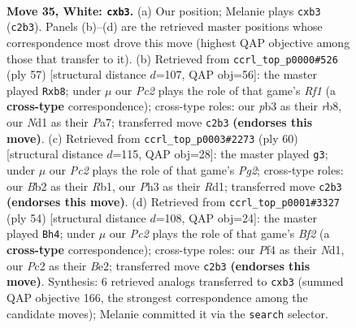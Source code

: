 \documentclass[11pt]{article}
\begin{document}
\clearpage

\begin{figure}[p]\centering
\begin{subfigure}{0.46\textwidth}\centering
\resizebox{\linewidth}{!}{%
\newchessgame
\chessboard[
  setfen={1n1qkb1r/4n3/r1p3p1/3p2P1/1Q1P1PBp/1p5P/1BP4R/2RN1K2 w - - 0 35},
  showmover=false,
  pgfstyle=straightmove, color=movearrow, markmove={c2-b3}
]}
\caption{}
\end{subfigure}\hfill
\begin{subfigure}{0.46\textwidth}\centering
\resizebox{\linewidth}{!}{%
\newchessgame
\chessboard[
  setfen={1R3rk1/p4pp1/7p/3pPq1P/2b5/b3PN2/P2Q1PP1/R2N2K1 b - - 0 29},
  showmover=false,
  pgfstyle=straightmove, color=movearrow, markmove={f8-b8}
]}
\caption{}
\end{subfigure}
\\[4pt]
\begin{subfigure}{0.46\textwidth}\centering
\resizebox{\linewidth}{!}{%
\newchessgame
\chessboard[
  setfen={2r1n1k1/1q2bpp1/1p1pp3/1Pn5/rN1BP3/5P1p/6PP/1R1RQB1K w - - 0 31},
  showmover=false,
  pgfstyle=straightmove, color=movearrow, markmove={g2-g3}
]}
\caption{}
\end{subfigure}\hfill
\begin{subfigure}{0.46\textwidth}\centering
\resizebox{\linewidth}{!}{%
\newchessgame
\chessboard[
  setfen={1r2r1k1/5q1p/3R4/3P1b1n/1pp2p2/3n1P2/1P1QBBPP/3N1R1K w - - 1 28},
  showmover=false,
  pgfstyle=straightmove, color=movearrow, markmove={f2-h4}
]}
\caption{}
\end{subfigure}
\caption{\textbf{Move 35, White: \texttt{cxb3}.} (a) Our position; Melanie plays \texttt{cxb3} (\texttt{c2b3}). Panels (b)--(d) are the retrieved master positions whose correspondence most drove this move (highest QAP objective among those that transfer to it). (b) Retrieved from \texttt{ccrl\_top\_p0000\#526} (ply 57) [structural distance $d$=107, QAP obj=56]: the master played \texttt{Rxb8}; under $\mu$ our \emph{Pc2} plays the role of that game's \emph{Rf1} (a \textbf{cross-type} correspondence); cross-type roles: our \emph{p}b3 as their \emph{r}b8, our \emph{N}d1 as their \emph{P}a7; transferred move \texttt{c2b3} \textbf{(endorses this move)}. (c) Retrieved from \texttt{ccrl\_top\_p0003\#2273} (ply 60) [structural distance $d$=115, QAP obj=28]: the master played \texttt{g3}; under $\mu$ our \emph{Pc2} plays the role of that game's \emph{Pg2}; cross-type roles: our \emph{B}b2 as their \emph{R}b1, our \emph{P}h3 as their \emph{R}d1; transferred move \texttt{c2b3} \textbf{(endorses this move)}. (d) Retrieved from \texttt{ccrl\_top\_p0001\#3327} (ply 54) [structural distance $d$=108, QAP obj=24]: the master played \texttt{Bh4}; under $\mu$ our \emph{Pc2} plays the role of that game's \emph{Bf2} (a \textbf{cross-type} correspondence); cross-type roles: our \emph{P}f4 as their \emph{N}d1, our \emph{P}c2 as their \emph{B}e2; transferred move \texttt{c2b3} \textbf{(endorses this move)}. Synthesis: 6 retrieved analogs transferred to \texttt{cxb3} (summed QAP objective 166, the strongest correspondence among the candidate moves); Melanie committed it via the \texttt{search} selector.}
\label{fig:thought-m68}
\end{figure}
\end{document}
